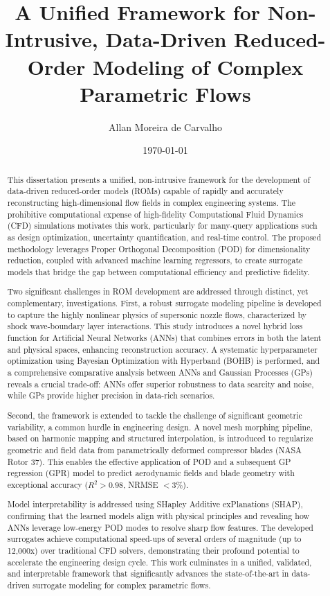 \documentclass[12pt, a4paper]{report}
\title{\textbf{A Unified Framework for Non-Intrusive, Data-Driven Reduced-Order Modeling of Complex Parametric Flows}}
\author{Allan Moreira de Carvalho}
\date{\today}
\begin{document}
\maketitle
\tableofcontents

\begin{abstract}
This dissertation presents a unified, non-intrusive framework for the development of data-driven reduced-order models (ROMs) capable of rapidly and accurately reconstructing high-dimensional flow fields in complex engineering systems. The prohibitive computational expense of high-fidelity Computational Fluid Dynamics (CFD) simulations motivates this work, particularly for many-query applications such as design optimization, uncertainty quantification, and real-time control. The proposed methodology leverages Proper Orthogonal Decomposition (POD) for dimensionality reduction, coupled with advanced machine learning regressors, to create surrogate models that bridge the gap between computational efficiency and predictive fidelity.

Two significant challenges in ROM development are addressed through distinct, yet complementary, investigations. First, a robust surrogate modeling pipeline is developed to capture the highly nonlinear physics of supersonic nozzle flows, characterized by shock wave-boundary layer interactions. This study introduces a novel hybrid loss function for Artificial Neural Networks (ANNs) that combines errors in both the latent and physical spaces, enhancing reconstruction accuracy. A systematic hyperparameter optimization using Bayesian Optimization with Hyperband (BOHB) is performed, and a comprehensive comparative analysis between ANNs and Gaussian Processes (GPs) reveals a crucial trade-off: ANNs offer superior robustness to data scarcity and noise, while GPs provide higher precision in data-rich scenarios.

Second, the framework is extended to tackle the challenge of significant geometric variability, a common hurdle in engineering design. A novel mesh morphing pipeline, based on harmonic mapping and structured interpolation, is introduced to regularize geometric and field data from parametrically deformed compressor blades (NASA Rotor 37). This enables the effective application of POD and a subsequent GP regression (GPR) model to predict aerodynamic fields and blade geometry with exceptional accuracy ($R^{2} > 0.98$, NRMSE $< 3\%$).

Model interpretability is addressed using SHapley Additive exPlanations (SHAP), confirming that the learned models align with physical principles and revealing how ANNs leverage low-energy POD modes to resolve sharp flow features. The developed surrogates achieve computational speed-ups of several orders of magnitude (up to 12,000x) over traditional CFD solvers, demonstrating their profound potential to accelerate the engineering design cycle. This work culminates in a unified, validated, and interpretable framework that significantly advances the state-of-the-art in data-driven surrogate modeling for complex parametric flows.
\end{abstract}
\end{document}
